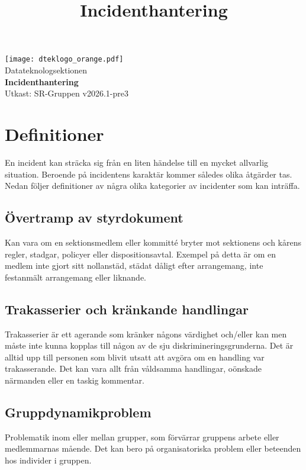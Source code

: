\documentclass[a4paper]{dtek}
\title{Incidenthantering}
\begin{document}
\begin{titlepage}
    \thispagestyle{empty} %
    \vspace*{1cm}
    \begin{center}
      \texttt{[image: dteklogo\_orange.pdf]}\\[3em]
      {\Huge Datateknologsektionen}\\[3em]
      {\Huge \textbf{Incidenthantering}}\\[1em]
      Utkast: SR-Gruppen v2026.1-pre3
    \end{center}
  \end{titlepage}

  \makeheadfoot

  \tableofcontents
\newpage
\section{Definitioner}
En incident kan sträcka sig från en liten händelse till en mycket allvarlig situation. Beroende på incidentens karaktär kommer således olika åtgärder tas. Nedan följer definitioner av några olika kategorier av incidenter som kan inträffa.

\subsection{Övertramp av styrdokument}
Kan vara om en sektionsmedlem eller kommitté bryter mot sektionens och kårens regler, stadgar, policyer eller dispositionsavtal. Exempel på detta är om en medlem inte gjort sitt nollanstäd, städat dåligt efter arrangemang, inte festanmält arrangemang eller liknande.

\subsection{Trakasserier och kränkande handlingar}
Trakasserier är ett agerande som kränker någons värdighet och/eller kan men måste inte kunna kopplas till någon av de sju diskrimineringsgrunderna. Det är alltid upp till personen som blivit utsatt att avgöra om en handling var trakasserande. Det kan vara allt från våldsamma handlingar, oönskade närmanden eller en taskig kommentar. 

\subsection{Gruppdynamikproblem}
Problematik inom eller mellan grupper, som förvärrar gruppens arbete eller medlemmarnas mående. Det kan bero på organisatoriska problem eller beteenden hos individer i gruppen.
\end{document}
